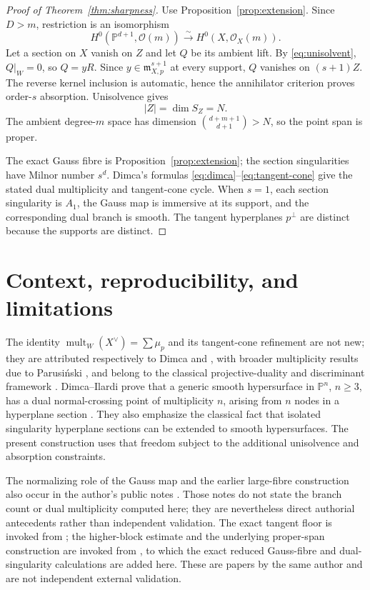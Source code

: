 \documentclass[11pt,a4paper]{article}
\theoremstyle{definition}
\newcommand{\PP}{\mathbb P}
\newcommand{\cO}{\mathcal O}
\newcommand{\m}{\mathfrak m}
\newcommand{\mult}{\operatorname{mult}}
\begin{document}
\begin{proof}[Proof of Theorem~\ref{thm:sharpness}]
Use Proposition~\ref{prop:extension}.  Since $D>m$, restriction is an
isomorphism
\[
 H^0(\PP^{d+1},\cO(m))\xrightarrow{\sim}H^0(X,\cO_X(m)).
\]
Let a section on $X$ vanish on $Z$ and let $Q$ be its ambient lift.  By
\eqref{eq:unisolvent}, $Q|_W=0$, so $Q=yR$.  Since
$y\in\m_{X,p}^{s+1}$ at every support, $Q$ vanishes on $(s+1)Z$.  The reverse
kernel inclusion is automatic, hence the annihilator criterion proves
order-$s$ absorption.  Unisolvence gives
\[
 |Z|=\dim S_Z=N.
\]
The ambient degree-$m$ space has dimension $\binom{d+m+1}{d+1}>N$, so the
point span is proper.

The exact Gauss fibre is Proposition~\ref{prop:extension}; the section
singularities have Milnor number $s^d$.  Dimca's formulas
\eqref{eq:dimca}--\eqref{eq:tangent-cone} give the stated dual multiplicity
and tangent-cone cycle.  When $s=1$, each section singularity is $A_1$, the
Gauss map is immersive at its support, and the corresponding dual branch is
smooth.  The tangent hyperplanes $p^\perp$ are distinct because the supports
are distinct.
\end{proof}

\section{Context, reproducibility, and limitations}

The identity $\mult_W(X^\vee)=\sum\mu_p$ and its tangent-cone refinement are
not new; they are attributed respectively to Dimca
\cite{Dimca1986} and \cite[Proposition~11.24]{Dimca1987}, with broader
multiplicity results due to Parusi\'nski \cite{Parusinski1991}, and belong to
the classical projective-duality and discriminant framework
\cite{Kleiman1986,GKZ1994}.  Dimca--Ilardi prove that a generic smooth
hypersurface in $\PP^n$, $n\geq3$, has a dual normal-crossing point of
multiplicity $n$, arising from $n$ nodes in a hyperplane section
\cite{DimcaIlardi2024}.  They also emphasize the classical fact that isolated
singularity hyperplane sections can be extended to smooth hypersurfaces.
The present construction uses that freedom subject to the additional
unisolvence and absorption constraints.

The normalizing role of the Gauss map and the earlier large-fibre construction
also occur in the author's public notes \cite{ErikssonB218,ErikssonB219}.
Those notes do not state the branch count or dual multiplicity computed here;
they are nevertheless direct authorial antecedents rather than independent
validation.  The exact tangent floor is invoked from
\cite{ErikssonTangent2026}; the higher-block estimate and the underlying
proper-span construction are invoked from \cite{ErikssonOsculating2026}, to
which the exact reduced Gauss-fibre and dual-singularity calculations are
added here.  These are papers by the same author and are not independent
external validation.
\end{document}
